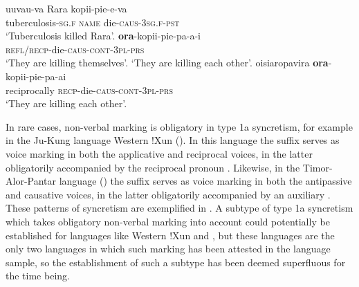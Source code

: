 \ea {} \citep[193, 221]{robinson:s:2011}
\ea\label{ex:Rotokas:kill:a}
	\gll	uuvau-va Rara kopii-pie-e-va \\
			tuberculosis-\textsc{sg.f} \textsc{name} die-\textsc{caus-3sg.f-pst} \\
	\glt	‘Tuberculosis killed Rara’.
\ex\label{ex:Rotokas:kill:b}
	\gll	\textbf{ora}-kopii-pie-pa-a-i \\
			\textsc{refl/recp}-die-\textsc{caus-cont-3pl-prs} \\
	\glt	‘They are killing themselves’.
	\glt	‘They are killing each other’.
\ex\label{ex:Rotokas:kill:c}
	\gll	oisiaropavira \textbf{ora}-kopii-pie-pa-ai \\
			reciprocally \textsc{recp}-die-\textsc{caus-cont-3pl-prs} \\
	\glt	‘They are killing each other’.
	\z
\z

In rare cases, non-verbal marking is obligatory in type 1a syncretism, for example in the Ju-Kung language Western !Xun (). In this language the suffix  serves as voice marking in both the applicative and reciprocal voices, in the latter obligatorily accompanied by the reciprocal pronoun . Likewise, in the Timor-Alor-Pantar language  () the suffix  serves as voice marking in both the antipassive and causative voices, in the latter obligatorily accompanied by an auxiliary . These patterns of syncretism are exemplified in . A subtype of type 1a syncretism which takes obligatory non-verbal marking into account could potentially be established for languages like Western !Xun and , but these languages are the only two languages in which such marking has been attested in the language sample, so the establishment of such a subtype has been deemed superfluous for the time being.

